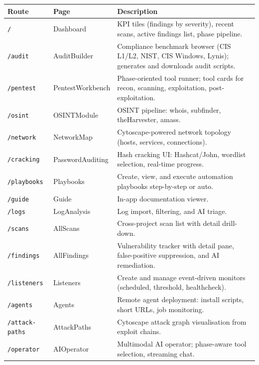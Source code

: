 \documentclass[11pt,a4paper,twoside,openright]{book}
\begin{document}
\begin{longtable}{L{3.5cm} L{4cm} X}
\toprule
\textbf{Route} & \textbf{Page} & \textbf{Description} \\
\midrule
\endhead
\texttt{/}               & Dashboard            & KPI tiles (findings by severity), recent scans, active findings list, phase pipeline. \\
\texttt{/audit}          & AuditBuilder         & Compliance benchmark browser (CIS L1/L2, NIST, CIS Windows, Lynis); generates and downloads audit scripts. \\
\texttt{/pentest}        & PentestWorkbench     & Phase-oriented tool runner; tool cards for recon, scanning, exploitation, post-exploitation. \\
\texttt{/osint}          & OSINTModule          & OSINT pipeline: whois, subfinder, theHarvester, amass. \\
\texttt{/network}        & NetworkMap           & Cytoscape-powered network topology (hosts, services, connections). \\
\texttt{/cracking}       & PasswordAuditing     & Hash cracking UI: Hashcat/John, wordlist selection, real-time progress. \\
\texttt{/playbooks}      & Playbooks            & Create, view, and execute automation playbooks step-by-step or auto. \\
\texttt{/guide}          & Guide                & In-app documentation viewer. \\
\texttt{/logs}           & LogAnalysis          & Log import, filtering, and AI triage. \\
\texttt{/scans}          & AllScans             & Cross-project scan list with detail drill-down. \\
\texttt{/findings}       & AllFindings          & Vulnerability tracker with detail pane, false-positive suppression, and AI remediation. \\
\texttt{/listeners}      & Listeners            & Create and manage event-driven monitors (scheduled, threshold, healthcheck). \\
\texttt{/agents}         & Agents               & Remote agent deployment: install scripts, short URLs, job monitoring. \\
\texttt{/attack-paths}   & AttackPaths          & Cytoscape attack graph visualisation from exploit chains. \\
\texttt{/operator}       & AIOperator           & Multimodal AI operator; phase-aware tool selection, streaming chat. \\

\end{longtable}
\end{document}
